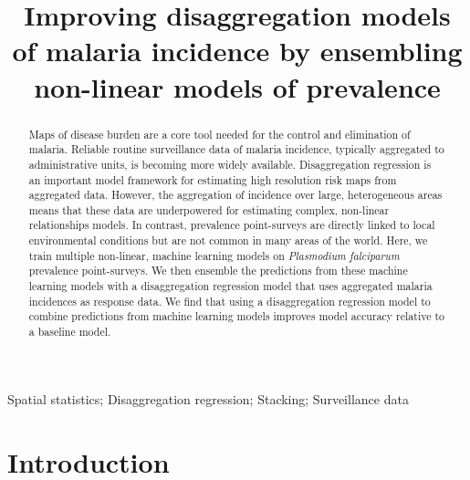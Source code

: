 \documentclass[review]{elsarticle}
\begin{document}









\begin{frontmatter}

\title{Improving disaggregation models of malaria incidence by ensembling non-linear models of prevalence}


\begin{abstract}

Maps of disease burden are a core tool needed for the control and elimination of malaria.
Reliable routine surveillance data of malaria incidence, typically aggregated to administrative units, is becoming more widely available.
Disaggregation regression is an important model framework for estimating high resolution risk maps from aggregated data.
However, the aggregation of incidence over large, heterogeneous areas means that these data are underpowered for estimating complex, non-linear relationships models.
In contrast, prevalence point-surveys are directly linked to local environmental conditions but are not common in many areas of the world.
Here, we train multiple non-linear, machine learning models on \emph{Plasmodium falciparum} prevalence point-surveys.
We then ensemble the predictions from these machine learning models with a disaggregation regression model that uses aggregated malaria incidences as response data.
We find that using a disaggregation regression model to combine predictions from machine learning models improves model accuracy relative to a baseline model.

\end{abstract}

\begin{keyword}
Spatial statistics; Disaggregation regression; Stacking; Surveillance data
\end{keyword}

\end{frontmatter}

\linenumbers



\section{Introduction}
\end{document}
